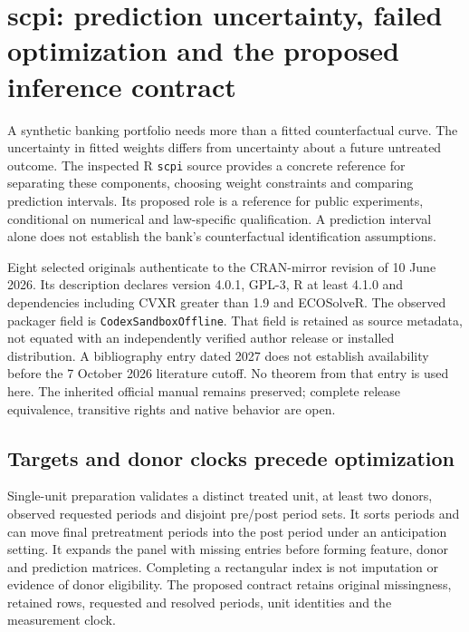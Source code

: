 \section{scpi: prediction uncertainty, failed optimization and the proposed inference contract}
\label{sec:exec24-scpi-reuse}

A synthetic banking portfolio needs more than a fitted counterfactual curve.
The uncertainty in fitted weights differs from uncertainty about a future
untreated outcome. The inspected R \texttt{scpi} source provides a concrete
reference for separating these components, choosing weight constraints and
comparing prediction intervals. Its proposed role is a reference for public
experiments, conditional on numerical and law-specific qualification. A
prediction interval alone does not establish the bank's counterfactual
identification assumptions.~\citep{exec24_scpi_choice}

Eight selected originals authenticate to the CRAN-mirror revision of 10 June
2026. Its description declares version 4.0.1, GPL-3, R at least 4.1.0 and
dependencies including CVXR greater than 1.9 and ECOSolveR. The observed
packager field is \texttt{CodexSandboxOffline}. That field is retained as
source metadata, not equated with an independently verified author release
or installed distribution. A bibliography entry dated 2027 does not establish
availability before the 7 October 2026 literature cutoff. No theorem from
that entry is used here. The inherited official manual remains preserved;
complete release equivalence, transitive rights and native behavior are open.
\citep{exec24_scpi_source,v12_sw_scpi}

\subsection{Targets and donor clocks precede optimization}
Single-unit preparation validates a distinct treated unit, at least two
donors, observed requested periods and disjoint pre/post period sets. It sorts
periods and can move final pretreatment periods into the post period under
an anticipation setting. It expands the panel with missing entries before
forming feature, donor and prediction matrices. Completing a rectangular
index is not imputation or evidence of donor eligibility. The proposed
contract retains original missingness, retained rows, requested and resolved
periods, unit identities and the measurement clock.
\citep{exec24_scpi_source}

